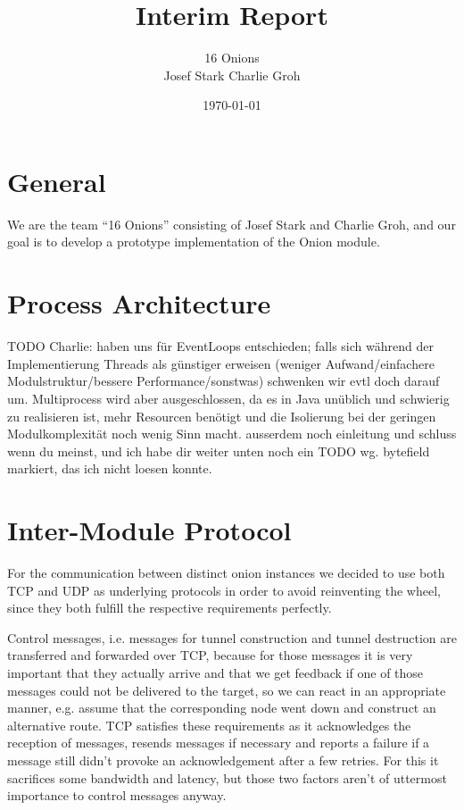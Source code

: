 \documentclass{article}
\begin{document}
\title{\Huge Interim Report \normalsize}
\date{\today}
\author{\LARGE 16 Onions \normalsize \\[5pt] Josef Stark \hspace{20pt} Charlie Groh}
\maketitle
{\let\thefootnote\relax{}}

\section{General}
We are the team ``16 Onions'' consisting of Josef Stark and Charlie Groh,
and our goal is to develop a prototype implementation of the Onion module.

\section{Process Architecture}
TODO Charlie: haben uns für EventLoops entschieden; falls sich während der Implementierung Threads als günstiger erweisen (weniger Aufwand/einfachere Modulstruktur/bessere Performance/sonstwas) schwenken wir evtl doch darauf um. Multiprocess wird aber ausgeschlossen, da es in Java unüblich und schwierig zu realisieren ist, mehr Resourcen benötigt und die Isolierung bei der geringen Modulkomplexität noch wenig Sinn macht.
ausserdem noch einleitung und schluss wenn du meinst, und ich habe dir weiter unten noch ein TODO wg. bytefield markiert, das ich nicht loesen konnte.

\section{Inter-Module Protocol}
For the communication between distinct onion instances we decided to use both TCP and UDP as underlying protocols in order to avoid reinventing the wheel, since they both fulfill the respective requirements perfectly.

Control messages, i.e. messages for tunnel construction and tunnel destruction are transferred and forwarded over TCP, because for those messages it is very important that they actually arrive and that we get feedback if one of those messages could not be delivered to the target, so we can react in an appropriate manner, e.g. assume that the corresponding node went down and construct an alternative route. TCP satisfies these requirements as it acknowledges the reception of messages, resends messages if necessary and reports a failure if a message still didn't provoke an acknowledgement after a few retries. For this it sacrifices some bandwidth and latency, but those two factors aren't of uttermost importance to control messages anyway. 
\end{document}
